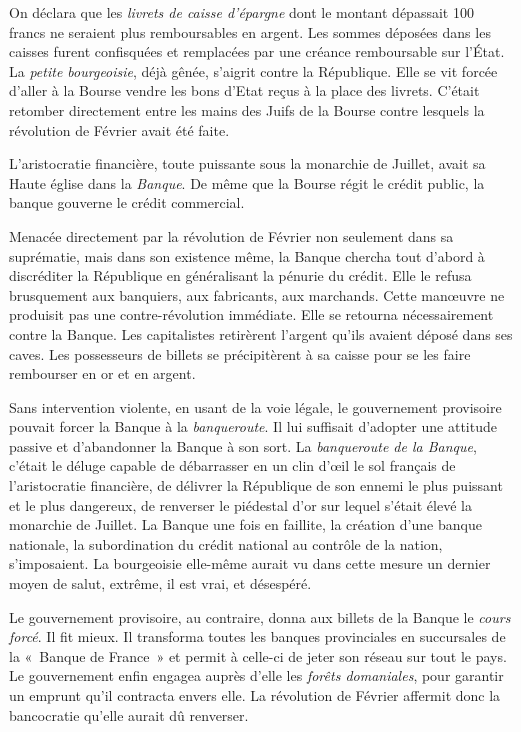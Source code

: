 \documentclass[french,twoside]{book} %
\begin{document}
On déclara que les \emph{livrets de caisse d’épargne} dont le montant dépassait 100 francs ne seraient plus remboursables en argent. Les sommes déposées dans les caisses furent confisquées et remplacées par une créance remboursable sur l’État. La \emph{petite bourgeoisie}, déjà gênée, s’aigrit contre la République. Elle se vit forcée d’aller à la Bourse vendre les bons d’Etat reçus à la place des livrets. C’était retomber directement entre les mains des Juifs de la Bourse contre lesquels la révolution de Février avait été faite.\par
L’aristocratie financière, toute puissante sous la monarchie de Juillet, avait sa Haute église dans la \emph{Banque}. De même que la Bourse régit le crédit public, la banque gouverne le crédit commercial.\par
Menacée directement par la révolution de Février non seulement dans sa suprématie, mais dans son existence même, la Banque chercha tout d’abord à discréditer la République en généralisant la pénurie du crédit. Elle le refusa brusquement aux banquiers, aux fabricants, aux marchands. Cette manœuvre ne produisit pas une contre-révolution immédiate. Elle se retourna nécessairement contre la Banque. Les capitalistes retirèrent l’argent qu’ils avaient déposé dans ses caves. Les possesseurs de billets se précipitèrent à sa caisse pour se les faire rembourser en or et en argent.\par
Sans intervention violente, en usant de la voie légale, le gouvernement provisoire pouvait forcer la Banque à la \emph{banqueroute}. Il lui suffisait d’adopter une attitude passive et d’abandonner la Banque à son sort. La \emph{banqueroute de la Banque}, c’était le déluge capable de débarrasser en un clin d’œil le sol français de l’aristocratie financière, de délivrer la République de son ennemi le plus puissant et le plus dangereux, de renverser le piédestal d’or sur lequel s’était élevé la monarchie de Juillet. La Banque une fois en faillite, la création d’une banque nationale, la subordination du crédit national au contrôle de la nation, s’imposaient. La bourgeoisie elle-même aurait vu dans cette mesure un dernier moyen de salut, extrême, il est vrai, et désespéré.\par
Le gouvernement provisoire, au contraire, donna aux billets de la Banque le \emph{cours forcé}. Il fit mieux. Il transforma toutes les banques provinciales en succursales de la « Banque de France » et permit à celle-ci de jeter son réseau sur tout le pays. Le gouvernement enfin engagea auprès d’elle les \emph{forêts domaniales}, pour garantir un emprunt qu’il contracta envers elle. La révolution de Février affermit donc la bancocratie qu’elle aurait dû renverser.\par
\end{document}
